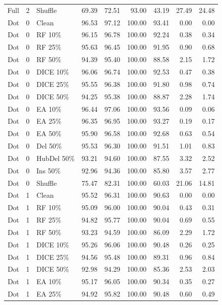 {\begin{longtable}{rllrrrrrr}
Full & 2 & Shuffle & 69.39 & 72.51 & 93.00 & 43.19 & 27.49 & 24.48 \\
Dot & 0 & Clean & 96.53 & 97.12 & 100.00 & 93.41 & 0.00 & 0.00 \\
Dot & 0 & RF 10\% & 96.15 & 96.78 & 100.00 & 92.24 & 0.38 & 0.34 \\
Dot & 0 & RF 25\% & 95.63 & 96.45 & 100.00 & 91.95 & 0.90 & 0.68 \\
Dot & 0 & RF 50\% & 94.39 & 95.40 & 100.00 & 88.58 & 2.15 & 1.72 \\
Dot & 0 & DICE 10\% & 96.06 & 96.74 & 100.00 & 92.53 & 0.47 & 0.38 \\
Dot & 0 & DICE 25\% & 95.55 & 96.38 & 100.00 & 91.80 & 0.98 & 0.74 \\
Dot & 0 & DICE 50\% & 94.25 & 95.38 & 100.00 & 88.87 & 2.28 & 1.74 \\
Dot & 0 & EA 10\% & 96.44 & 97.06 & 100.00 & 93.56 & 0.09 & 0.06 \\
Dot & 0 & EA 25\% & 96.35 & 96.95 & 100.00 & 93.27 & 0.19 & 0.17 \\
Dot & 0 & EA 50\% & 95.90 & 96.58 & 100.00 & 92.68 & 0.63 & 0.54 \\
Dot & 0 & Del 50\% & 95.53 & 96.30 & 100.00 & 91.51 & 1.01 & 0.83 \\
Dot & 0 & HubDel 50\% & 93.21 & 94.60 & 100.00 & 87.55 & 3.32 & 2.52 \\
Dot & 0 & Ins 50\% & 92.96 & 94.36 & 100.00 & 85.80 & 3.57 & 2.77 \\
Dot & 0 & Shuffle & 75.47 & 82.31 & 100.00 & 60.03 & 21.06 & 14.81 \\
Dot & 1 & Clean & 95.52 & 96.31 & 100.00 & 90.63 & 0.00 & 0.00 \\
Dot & 1 & RF 10\% & 95.09 & 96.00 & 100.00 & 90.04 & 0.43 & 0.31 \\
Dot & 1 & RF 25\% & 94.82 & 95.77 & 100.00 & 90.04 & 0.69 & 0.55 \\
Dot & 1 & RF 50\% & 93.23 & 94.59 & 100.00 & 86.09 & 2.29 & 1.72 \\
Dot & 1 & DICE 10\% & 95.26 & 96.06 & 100.00 & 90.48 & 0.26 & 0.25 \\
Dot & 1 & DICE 25\% & 94.56 & 95.48 & 100.00 & 89.31 & 0.96 & 0.84 \\
Dot & 1 & DICE 50\% & 92.98 & 94.29 & 100.00 & 85.36 & 2.53 & 2.03 \\
Dot & 1 & EA 10\% & 95.17 & 96.05 & 100.00 & 90.34 & 0.35 & 0.27 \\
Dot & 1 & EA 25\% & 94.92 & 95.82 & 100.00 & 90.48 & 0.60 & 0.49 \\

\end{longtable}}
